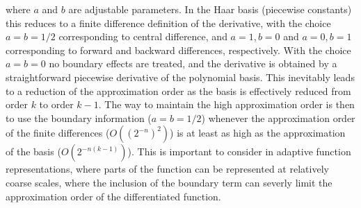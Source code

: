 where $a$ and $b$ are adjustable parameters. In the Haar basis (piecewise constants)
this reduces to a finite difference definition of the derivative, with the choice 
$a=b=1/2$ corresponding to central difference, and $a=1,b=0$ and $a=0,b=1$ 
corresponding to forward and backward differences, respectively. With the choice
$a=b=0$ no boundary effects are treated, and the derivative is obtained by a 
straightforward piecewise derivative of the polynomial basis. This inevitably leads
to a reduction of the approximation order as the basis is effectively reduced from
order $k$ to order $k-1$. The way to maintain the high approximation order is then
to use the boundary information ($a=b=1/2$) whenever the approximation order of
the finite differences ($O((2^{-n})^2)$) is at least as high as the approximation of the 
basis ($O(2^{-n(k-1)})$). This is important to consider in adaptive function representations,
where parts of the function can be represented at relatively coarse scales, where
the inclusion of the boundary term can severly limit the approximation order of
the differentiated function.

